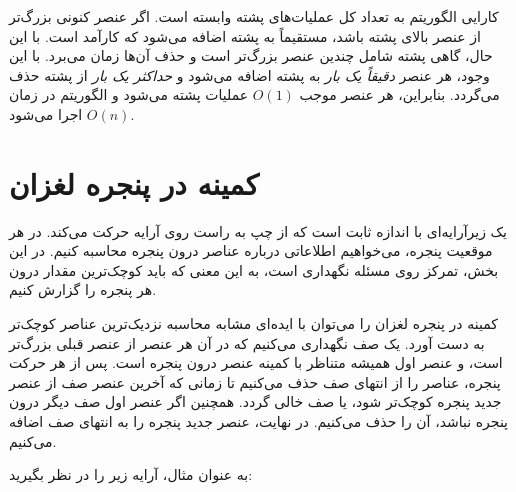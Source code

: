 \begin{center}
\end{center}

کارایی الگوریتم به تعداد کل عملیات‌های پشته وابسته است.
اگر عنصر کنونی بزرگ‌تر از عنصر بالای پشته باشد،
مستقیماً به پشته اضافه می‌شود که کارآمد است.
با این حال، گاهی پشته شامل چندین عنصر بزرگ‌تر است
و حذف آن‌ها زمان می‌برد.
با این وجود، هر عنصر \emph{دقیقاً یک بار} به پشته اضافه می‌شود
و \emph{حداکثر یک بار} از پشته حذف می‌گردد.
بنابراین، هر عنصر موجب $O(1)$ عملیات پشته می‌شود
و الگوریتم در زمان $O(n)$ اجرا می‌شود.

\section{کمینه در پنجره لغزان}


یک  زیرآرایه‌ای با اندازه ثابت است
که از چپ به راست روی آرایه حرکت می‌کند.
در هر موقعیت پنجره،
می‌خواهیم اطلاعاتی درباره عناصر درون پنجره محاسبه کنیم.
در این بخش، تمرکز روی مسئله نگهداری
 است،
به این معنی که باید کوچک‌ترین مقدار درون هر پنجره را گزارش کنیم.

کمینه در پنجره لغزان را می‌توان با ایده‌ای مشابه
محاسبه نزدیک‌ترین عناصر کوچک‌تر به دست آورد.
یک صف نگهداری می‌کنیم که در آن هر عنصر از عنصر قبلی بزرگ‌تر است،
و عنصر اول همیشه متناظر با کمینه عنصر درون پنجره است.
پس از هر حرکت پنجره،
عناصر را از انتهای صف حذف می‌کنیم
تا زمانی که آخرین عنصر صف از عنصر جدید پنجره کوچک‌تر شود،
یا صف خالی گردد.
همچنین اگر عنصر اول صف دیگر درون پنجره نباشد،
آن را حذف می‌کنیم.
در نهایت، عنصر جدید پنجره را به انتهای صف اضافه می‌کنیم.

به عنوان مثال، آرایه زیر را در نظر بگیرید:

